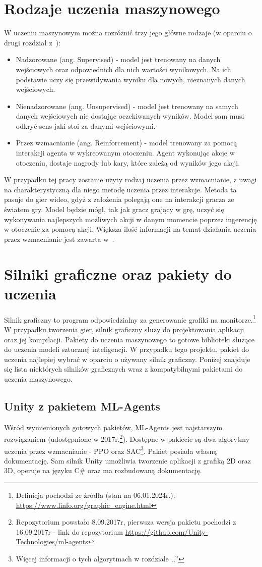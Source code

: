 \documentclass{SGGW-thesis}
\begin{document}
\section{Rodzaje uczenia maszynowego}
W uczeniu maszynowym można rozróżnić trzy jego główne rodzaje (w oparciu o drugi rozdział z~\cite{MachineLearningTypes}):
\begin{itemize}
  \item{Nadzorowane (ang. Supervised) - model jest trenowany na danych wejściowych oraz odpowiednich dla nich wartości wynikowych. Na ich podstawie uczy się przewidywania wyniku dla nowych, nieznanych danych wejściowych.}
  \item{Nienadzorowane (ang. Unsupervised) - model jest trenowany na samych danych wejściowych nie dostając oczekiwanych wyników. Model sam musi odkryć sens jaki stoi za danymi wejściowymi.}
  \item{Przez wzmacnianie (ang. Reinforcement) - model trenowany za pomocą interakcji agenta w wykreowanym otoczeniu. Agent wykonując akcje w otoczeniu, dostaje nagrody lub kary, które zależą od wyników jego akcji.}
\end{itemize}
W przypadku tej pracy zostanie użyty rodzaj uczenia przez wzmacnianie, z uwagi na charakterystyczną dla niego metodę uczenia przez interakcje. 
Metoda ta pasuje do gier wideo, gdyż z założenia polegają one na interakcji gracza ze światem gry. Model będzie mógł, tak jak gracz grający w grę, uczyć się wykonywania najlepszych możliwych akcji w danym momencie poprzez ingerencję w otoczenie za pomocą akcji. Większa ilość informacji na temat 
działania uczenia przez wzmacnianie jest zawarta w~\cite{ReinforcementLearning}.

\section{Silniki graficzne oraz pakiety do uczenia}
Silnik graficzny to program odpowiedzialny za generowanie grafiki na monitorze.\footnote{Definicja pochodzi ze źródła (stan na 06.01.2024r.): \url{https://www.linfo.org/graphic_engine.html}} W przypadku tworzenia gier, silnik graficzny służy do projektowania aplikacji oraz jej kompilacji. Pakiety do uczenia maszynowego to gotowe biblioteki służące do uczenia modeli sztucznej inteligencji. 
W przypadku tego projektu, pakiet do uczenia najlepiej wybrać w oparciu o używany silnik graficzny. Poniżej znajduje się lista niektórych silników graficznych wraz z kompatybilnymi pakietami do uczenia maszynowego.
\subsection{Unity z pakietem ML-Agents}
Wśród wymienionych gotowych pakietów, ML-Agents jest najstarszym rozwiązaniem (udostępnione w 2017r.\footnote{Repozytorium powstało 8.09.2017r, pierwsza wersja pakietu pochodzi z 16.09.2017r - link do repozytorium \url{https://github.com/Unity-Technologies/ml-agents}}).
Dostępne w pakiecie są dwa algorytmy uczenia przez wzmacnianie - PPO oraz SAC\footnote{Więcej informacji o tych algorytmach w rozdziale ,,''}. Pakiet posiada własną dokumentację\cite{MLAgentsDocs}. 
Sam silnik Unity umożliwia tworzenie aplikacji z grafiką 2D oraz 3D, operuje na języku C\# oraz ma rozbudowaną dokumentację\cite{UnityDocs}.
\end{document}
